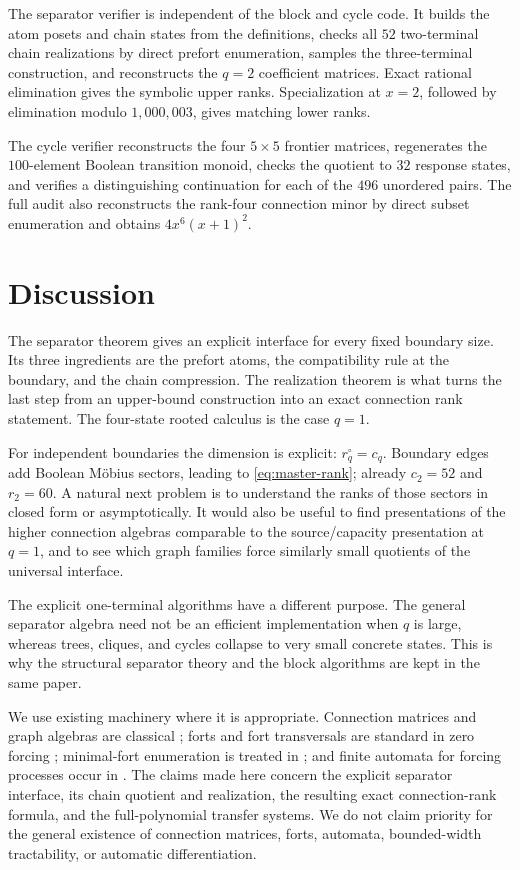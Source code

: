 \documentclass[11pt,reqno]{amsart}
\theoremstyle{definition}
\begin{document}
The separator verifier is independent of the block and cycle code.  It builds
the atom posets and chain states from the definitions, checks all $52$
two-terminal chain realizations by direct prefort enumeration, samples the
three-terminal construction, and reconstructs the $q=2$ coefficient matrices.
Exact rational elimination gives the symbolic upper ranks.  Specialization at
$x=2$, followed by elimination modulo $1{,}000{,}003$, gives matching lower
ranks.

The cycle verifier reconstructs the four $5\times5$ frontier matrices,
regenerates the $100$-element Boolean transition monoid, checks the quotient to
$32$ response states, and verifies a distinguishing continuation for each of
the $496$ unordered pairs.  The full audit also reconstructs the rank-four
connection minor by direct subset enumeration and obtains
$4x^6(x+1)^2$.

\section{Discussion}\label{sec:discussion}

The separator theorem gives an explicit interface for every fixed boundary
size.  Its three ingredients are the prefort atoms, the compatibility rule at
the boundary, and the chain compression.  The realization theorem is what
turns the last step from an upper-bound construction into an exact connection
rank statement.  The four-state rooted calculus is the case $q=1$.

For independent boundaries the dimension is explicit:
$r_q^{\circ}=c_q$.  Boundary edges add Boolean M\"obius sectors, leading to
\eqref{eq:master-rank}; already $c_2=52$ and $r_2=60$.  A natural next problem
is to understand the ranks of those sectors in closed form or asymptotically.
It would also be useful to find presentations of the higher connection
algebras comparable to the source/capacity presentation at $q=1$, and to see
which graph families force similarly small quotients of the universal
interface.

The explicit one-terminal algorithms have a different purpose.  The general
separator algebra need not be an efficient implementation when $q$ is large,
whereas trees, cliques, and cycles collapse to very small concrete states.
This is why the structural separator theory and the block algorithms are kept
in the same paper.

We use existing machinery where it is appropriate.  Connection matrices and
graph algebras are classical \cite{Lovasz2006,KotekMakowsky2014}; forts and
fort transversals are standard in zero forcing
\cite{AIM2008,CameronHogbenEtAl2026}; minimal-fort enumeration is treated in
\cite{BeckerEtAl2025,CameronLi2025,DatKenter2026,AbiadGhasemiNezhad2026}; and
finite automata for forcing processes occur in
\cite{ShamsizadehEtAl2021,ShamsizadehEtAl2024}.  The claims made here concern
the explicit separator interface, its chain quotient and realization, the
resulting exact connection-rank formula, and the full-polynomial transfer
systems.  We do not claim priority for the general existence of connection
matrices, forts, automata, bounded-width tractability, or automatic
differentiation.
\end{document}
